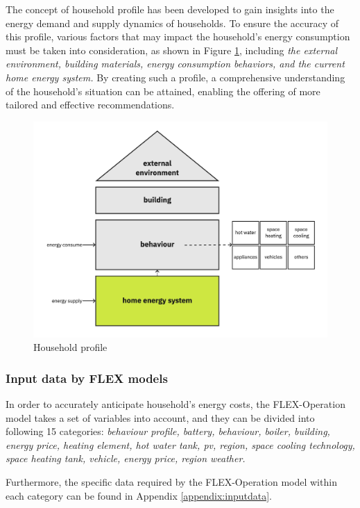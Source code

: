 The concept of household profile has been developed to gain insights into the energy demand and supply dynamics of households. 
To ensure the accuracy of this profile, various factors that may impact the household's energy consumption must be taken into consideration, as shown in Figure \ref{fig:profile}, including 
\emph{
    the external environment, 
    building materials, 
    energy consumption behaviors, 
    and the current home energy system. 
}
By creating such a profile, a comprehensive understanding of the household's situation can be attained, enabling the offering of more tailored and effective recommendations.
\begin{figure}[h]
    \centering
    \includegraphics[width=\textwidth]{Images/household_profile.jpg}
    \caption{Household profile}
    \label{fig:profile}
  \end{figure}

\subsubsection{Input data by FLEX models}

In order to accurately anticipate household's energy costs,
the FLEX-Operation model takes a set of variables into account,
and they can be divided into following 15 categories: 
\emph{
    behaviour profile,
    battery,
    behaviour, 
    boiler,
    building,
    energy price,
    heating element, 
    hot water tank,
    \gls{pv},
    region,
    space cooling technology,
    space heating tank,
    vehicle,
    energy price,
    region weather. 
}

Furthermore, the specific data required by the FLEX-Operation model within each category can be found in Appendix \ref{appendix:inputdata}. 


